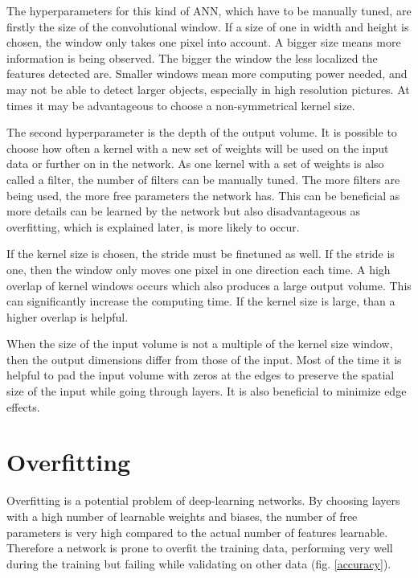 The hyperparameters for this kind of ANN, which have to be manually tuned, are firstly the size of the convolutional window. If a size of one in width and height is chosen, the window only takes one pixel into account. A bigger size means more information is being observed. The bigger the window the less localized the features detected are. Smaller windows mean more computing power needed, and may not be able to detect larger objects, especially in high resolution pictures. At times it may be advantageous to choose a non-symmetrical kernel size.

The second hyperparameter is the depth of the output volume. It is possible to choose how often a kernel with a new set of weights will be used on the input data or further on in the network. As one kernel with a set of weights is also called a filter, the number of filters can be manually tuned. The more filters are being used, the more free parameters the network has. This can be beneficial as more details can be learned by the network but also disadvantageous as overfitting, which is explained later, is more likely to occur.

If the kernel size is chosen, the stride must be finetuned as well. If the stride is one, then the window only moves one pixel in one direction each time. A high overlap of kernel windows occurs which also produces a large output volume. This can significantly increase the computing time. If the kernel size is large, than a higher overlap is helpful.

When the size of the input volume is not a multiple of the kernel size window, then the output dimensions differ from those of the input. Most of the time it is helpful to pad the input volume with zeros at the edges to preserve the spatial size of the input while going through layers. It is also beneficial to minimize edge effects. \cite{lecun-89e}

\section{Overfitting}
Overfitting is a potential problem of deep-learning networks. By choosing layers with a high number of learnable weights and biases, the number of free parameters is very high compared to the actual number of features learnable. Therefore a network is prone to overfit the training data, performing very well during the training but failing while validating on other data (fig. \ref{accuracy}). 

